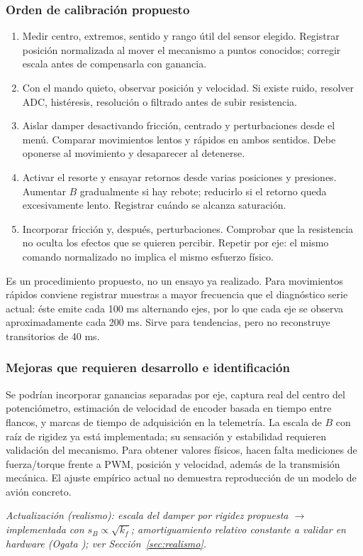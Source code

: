 \subsubsection{Orden de calibración propuesto}
\begin{enumerate}
\item Medir centro, extremos, sentido y rango útil del sensor elegido. Registrar posición normalizada al mover el mecanismo a puntos conocidos; corregir escala antes de compensarla con ganancia.
\item Con el mando quieto, observar posición y velocidad. Si existe ruido, resolver ADC, histéresis, resolución o filtrado antes de subir resistencia.
\item Aislar damper desactivando fricción, centrado y perturbaciones desde el menú. Comparar movimientos lentos y rápidos en ambos sentidos. Debe oponerse al movimiento y desaparecer al detenerse.
\item Activar el resorte y ensayar retornos desde varias posiciones y presiones. Aumentar $B$ gradualmente si hay rebote; reducirlo si el retorno queda excesivamente lento. Registrar cuándo se alcanza saturación.
\item Incorporar fricción y, después, perturbaciones. Comprobar que la resistencia no oculta los efectos que se quieren percibir. Repetir por eje: el mismo comando normalizado no implica el mismo esfuerzo físico.
\end{enumerate}
Es un procedimiento propuesto, no un ensayo ya realizado. Para movimientos rápidos conviene registrar muestras a mayor frecuencia que el diagnóstico serie actual: éste emite cada 100 ms alternando ejes, por lo que cada eje se observa aproximadamente cada 200 ms. Sirve para tendencias, pero no reconstruye transitorios de 40 ms.

\subsubsection{Mejoras que requieren desarrollo e identificación}
Se podrían incorporar ganancias separadas por eje, captura real del centro del potenciómetro, estimación de velocidad de encoder basada en tiempo entre flancos, y marcas de tiempo de adquisición en la telemetría. La escala de $B$ con raíz de rigidez ya está implementada; su sensación y estabilidad requieren validación del mecanismo. Para obtener valores físicos, hacen falta mediciones de fuerza/torque frente a PWM, posición y velocidad, además de la transmisión mecánica. El ajuste empírico actual no demuestra reproducción de un modelo de avión concreto.

\newpage

\textit{Actualización (realismo): escala del damper por rigidez propuesta $\rightarrow$ implementada con $s_B\propto\sqrt{k_f}$; amortiguamiento relativo constante a validar en hardware (Ogata \cite{ogata}); ver Sección~\ref{sec:realismo}.}

